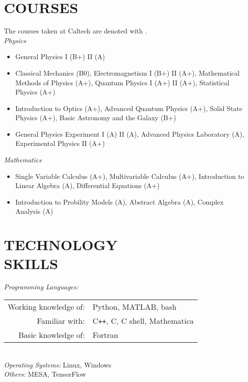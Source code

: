 \documentclass[margin, 10pt]{res} %
\begin{document}
\begin{resume}
\section{COURSES}
The courses taken at Caltech are denoted with \textsuperscript{\textdagger}.\\
\textit{Physics}
\begin{itemize}
    \item[] General Physics I (B+) II (A)
    \item[] Classical Mechanics (B0), Electromagnetism I (B+) II (A+), Mathematical Methods of Physics (A+), Quantum Physics I (A+) II (A+), Statistical Physics\textsuperscript{\textdagger} (A+)
    \item[] Introduction to Optics (A+), Advanced Quantum Physics (A+), Solid State Physics (A+), Basic Astronomy and the Galaxy\textsuperscript{\textdagger} (B+)
    \item[] General Physics Experiment I (A) II (A), Advanced Physics Laboratory\textsuperscript{\textdagger} (A), Experimental Physics II (A+)
\end{itemize}
\textit{Mathematics}
\begin{itemize}
    \item[] Single Variable Calculus (A+), Multivariable Calculus (A+), Introduction to Linear Algebra (A), Differential Equations (A+)
    \item[] Introduction to Probility Models\textsuperscript{\textdagger} (A), Abstract Algebra (A), Complex Analysis (A)
\end{itemize}


\section{TECHNOLOGY \\ SKILLS} 

{\sl Programming Languages:}\\%
\begin{tabular}{rl}
    Working knowledge of:& Python, MATLAB, bash\\
    Familiar with:& C\texttt{++}, C, C shell, Mathematica\\
     Basic knowledge of:& Fortran\\
\end{tabular}\\
{\sl Operating Systems:} Linux, Windows \\
{\sl Others:} MESA, TensorFlow\\
 

\end{resume}
\end{document}
